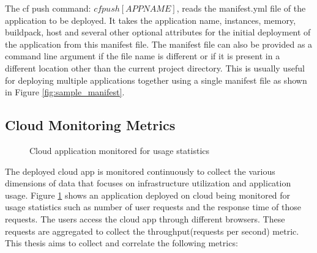 \documentclass[article,type=msc,colorback,12pt,accentcolor=tud8b,table]{tudthesis}
\begin{document}
The cf push command:  $ cf push  [APPNAME] $, reads the manifest.yml file of the application to be deployed. It takes the application name, instances, memory, buildpack, host and several other optional attributes for the initial deployment of the application from this manifest file. The manifest file can also be provided as a command line argument if the file name is different or if it is present in a different location other than the current project directory. This is usually useful for deploying multiple applications together using a single manifest file as shown in Figure \ref{fig:sample_manifest}.
	
\subsection{Cloud Monitoring Metrics} 
	
 \begin{figure}[!h]
 	\begin{center}
 		\makebox[\textwidth]{\texttt{[image: 4-1]}}
 	\end{center}
 	\caption{Cloud application monitored for usage statistics}
 	\label{fig:cloud_app_monitored}
  \end{figure}	
	
The deployed cloud app is monitored continuously to collect the various dimensions of data that focuses on infrastructure utilization and application usage. Figure \ref{fig:cloud_app_monitored} shows an application deployed on cloud being monitored for usage statistics such as number of user requests and the response time of those requests. The users access the cloud app through different browsers. These requests are aggregated to collect the throughput(requests per second) metric. This thesis aims to collect and correlate the following metrics:
\end{document}
